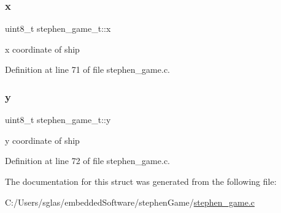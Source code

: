 \mbox{\label{structstephen__game__t_ae0dcb3293dee995b121c954c1f6a6687}} 
\subsubsection{\texorpdfstring{x}{x}}
{\footnotesize\ttfamily uint8\+\_\+t stephen\+\_\+game\+\_\+t\+::x}



x coordinate of ship 



Definition at line 71 of file stephen\+\_\+game.\+c.

\mbox{\label{structstephen__game__t_a59eebb9e6d67a454f592830896596b2b}} 
\subsubsection{\texorpdfstring{y}{y}}
{\footnotesize\ttfamily uint8\+\_\+t stephen\+\_\+game\+\_\+t\+::y}



y coordinate of ship 



Definition at line 72 of file stephen\+\_\+game.\+c.



The documentation for this struct was generated from the following file\+:\begin{DoxyCompactItemize}
\item 
C\+:/\+Users/sglas/embedded\+Software/stephen\+Game/\mbox{\hyperlink{stephen__game_8c}{stephen\+\_\+game.\+c}}\end{DoxyCompactItemize}

